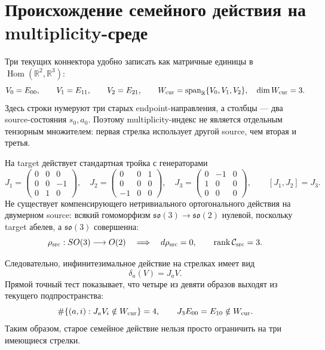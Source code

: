 \chapter{Происхождение семейного действия на multiplicity-среде}
\label{ch:v8-baryon-c0-multiplicity-environment-so3-action-parent-origin-gate}

Три текущих коннектора удобно записать как матричные единицы в
$\operatorname{Hom}(\mathbb R^2,\mathbb R^3)$:
\begin{equation}
 V_0=E_{00},\qquad V_1=E_{11},\qquad V_2=E_{21},\qquad
 W_{\rm cur}=\operatorname{span}_{\mathbb R}\{V_0,V_1,V_2\},
 \quad \dim W_{\rm cur}=3.
 \label{eq:v8-baryon-c0-current-arrow-matrix-model}
\end{equation}
Здесь строки нумеруют три старых endpoint-направления, а столбцы ---
два source-состояния $s_0,a_0$. Поэтому multiplicity-индекс не является
отдельным тензорным множителем: первая стрелка использует другой source,
чем вторая и третья.

На target действует стандартная тройка с генераторами
\begin{equation}
 J_1=\begin{pmatrix}0&0&0\\0&0&-1\\0&1&0\end{pmatrix},\quad
 J_2=\begin{pmatrix}0&0&1\\0&0&0\\-1&0&0\end{pmatrix},\quad
 J_3=\begin{pmatrix}0&-1&0\\1&0&0\\0&0&0\end{pmatrix},
 \qquad [J_1,J_2]=J_3.
 \label{eq:v8-baryon-c0-arrow-target-so3-generators}
\end{equation}
Не существует компенсирующего нетривиального ортогонального действия на
двумерном source: всякий гомоморфизм $\mathfrak{so}(3)\to\mathfrak{so}(2)$
нулевой, поскольку target абелев, а $\mathfrak{so}(3)$ совершенна:
\begin{equation}
 \rho_{\rm src}:SO(3)\longrightarrow O(2)
 \quad\Longrightarrow\quad d\rho_{\rm src}=0,
 \qquad \operatorname{rank}\mathcal C_{\rm src}=3.
 \label{eq:v8-baryon-c0-source-two-dimensional-so3-triviality}
\end{equation}

Следовательно, инфинитезимальное действие на стрелках имеет вид
\begin{equation}
 \delta_a(V)=J_aV.
 \label{eq:v8-baryon-c0-arrow-infinitesimal-so3-action}
\end{equation}
Прямой точный тест показывает, что четыре из девяти образов выходят из
текущего подпространства:
\begin{equation}
 \#\{(a,i):J_aV_i\notin W_{\rm cur}\}=4,
 \qquad J_3E_{00}=E_{10}\notin W_{\rm cur}.
 \label{eq:v8-baryon-c0-current-arrow-space-not-so3-invariant}
\end{equation}
Таким образом, старое семейное действие нельзя просто ограничить на три
имеющиеся стрелки.

